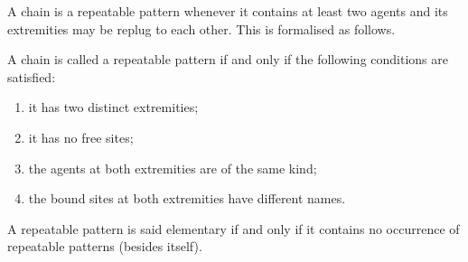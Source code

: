 \documentclass{entcs}
\begin{document}
A chain is a repeatable pattern whenever it contains at least two agents and its extremities may be replug to each other. This is formalised as follows.

\begin{defn}
A chain is called a repeatable pattern if and only if the following conditions are satisfied:
\begin{enumerate}
\item it has two distinct extremities;
\item it has no free sites;
\item the agents at both extremities are of the same kind;
\item the bound sites at both extremities have different names.
\end{enumerate}
A repeatable pattern is said elementary if and only if it contains no occurrence of repeatable patterns (besides itself).
\end{defn}
\end{document}
